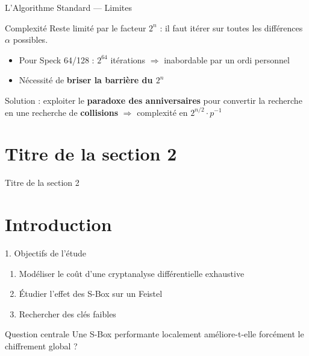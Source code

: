\documentclass[10pt]{beamer}
\begin{document}
\begin{frame}{L'Algorithme Standard — Limites} %
 
    \begin{block}{Complexité}
        Reste limité par le facteur $2^n$ : il faut itérer sur toutes les différences $\alpha$ possibles.
    \end{block}
 
    \begin{itemize}
        \item Pour Speck 64/128 : $2^{64}$ itérations $\Rightarrow$ inabordable par un ordi personnel
        \item Nécessité de \textbf{briser la barrière du $2^n$}
    \end{itemize}
 
    \begin{block}{}
        Solution : exploiter le \textbf{paradoxe des anniversaires} pour convertir la recherche en une recherche de \textbf{collisions} $\Rightarrow$ complexité en $2^{n/2} \cdot p^{-1}$
    \end{block}
\end{frame}
\section{Titre de la section 2}
\begin{frame}{Titre de la section 2}
\end{frame}

\section{Introduction}

\begin{frame}{1. Objectifs de l'étude}

\begin{enumerate}
    \item Modéliser le coût d'une cryptanalyse différentielle exhaustive
    \item Étudier l'effet des S-Box sur un Feistel
    \item Rechercher des clés faibles
\end{enumerate}

\vspace{0.4cm}

\begin{block}{Question centrale}
Une S-Box performante localement améliore-t-elle forcément le chiffrement global ?
\end{block}

\end{frame}
\end{document}
